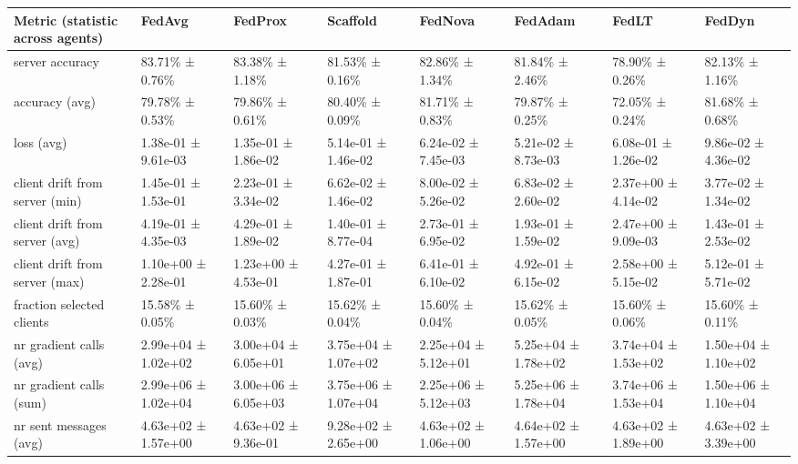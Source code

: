 \begin{tabular}{llllllll}
\hline
 Metric (statistic across agents)   & FedAvg              & FedProx             & Scaffold            & FedNova             & FedAdam             & FedLT               & FedDyn              \\
\hline
 server accuracy                    & 83.71\% ± 0.76\%      & 83.38\% ± 1.18\%      & 81.53\% ± 0.16\%      & 82.86\% ± 1.34\%      & 81.84\% ± 2.46\%      & 78.90\% ± 0.26\%      & 82.13\% ± 1.16\%      \\
 accuracy (avg)                     & 79.78\% ± 0.53\%      & 79.86\% ± 0.61\%      & 80.40\% ± 0.09\%      & 81.71\% ± 0.83\%      & 79.87\% ± 0.25\%      & 72.05\% ± 0.24\%      & 81.68\% ± 0.68\%      \\
 loss (avg)                         & 1.38e-01 ± 9.61e-03 & 1.35e-01 ± 1.86e-02 & 5.14e-01 ± 1.46e-02 & 6.24e-02 ± 7.45e-03 & 5.21e-02 ± 8.73e-03 & 6.08e-01 ± 1.26e-02 & 9.86e-02 ± 4.36e-02 \\
 client drift from server (min)     & 1.45e-01 ± 1.53e-01 & 2.23e-01 ± 3.34e-02 & 6.62e-02 ± 1.46e-02 & 8.00e-02 ± 5.26e-02 & 6.83e-02 ± 2.60e-02 & 2.37e+00 ± 4.14e-02 & 3.77e-02 ± 1.34e-02 \\
 client drift from server (avg)     & 4.19e-01 ± 4.35e-03 & 4.29e-01 ± 1.89e-02 & 1.40e-01 ± 8.77e-04 & 2.73e-01 ± 6.95e-02 & 1.93e-01 ± 1.59e-02 & 2.47e+00 ± 9.09e-03 & 1.43e-01 ± 2.53e-02 \\
 client drift from server (max)     & 1.10e+00 ± 2.28e-01 & 1.23e+00 ± 4.53e-01 & 4.27e-01 ± 1.87e-01 & 6.41e-01 ± 6.10e-02 & 4.92e-01 ± 6.15e-02 & 2.58e+00 ± 5.15e-02 & 5.12e-01 ± 5.71e-02 \\
 fraction selected clients          & 15.58\% ± 0.05\%      & 15.60\% ± 0.03\%      & 15.62\% ± 0.04\%      & 15.60\% ± 0.04\%      & 15.62\% ± 0.05\%      & 15.60\% ± 0.06\%      & 15.60\% ± 0.11\%      \\
 nr gradient calls (avg)            & 2.99e+04 ± 1.02e+02 & 3.00e+04 ± 6.05e+01 & 3.75e+04 ± 1.07e+02 & 2.25e+04 ± 5.12e+01 & 5.25e+04 ± 1.78e+02 & 3.74e+04 ± 1.53e+02 & 1.50e+04 ± 1.10e+02 \\
 nr gradient calls (sum)            & 2.99e+06 ± 1.02e+04 & 3.00e+06 ± 6.05e+03 & 3.75e+06 ± 1.07e+04 & 2.25e+06 ± 5.12e+03 & 5.25e+06 ± 1.78e+04 & 3.74e+06 ± 1.53e+04 & 1.50e+06 ± 1.10e+04 \\
 nr sent messages (avg)             & 4.63e+02 ± 1.57e+00 & 4.63e+02 ± 9.36e-01 & 9.28e+02 ± 2.65e+00 & 4.63e+02 ± 1.06e+00 & 4.64e+02 ± 1.57e+00 & 4.63e+02 ± 1.89e+00 & 4.63e+02 ± 3.39e+00 \\

\end{tabular}
